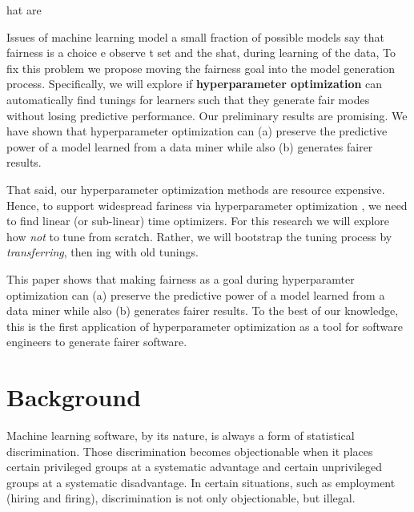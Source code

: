 hat are 

Issues of machine learning model 
a small fraction of   possible models say that {\e fairness is a choice}
e observe t set and the shat, during learning of the data,  To fix this problem we propose moving the fairness goal into the model generation process. Specifically, we will explore if 
  {\bf  hyperparameter optimization} can automatically find tunings for learners such that they generate fair modes without losing predictive performance. Our preliminary results are promising. We have shown that  hyperparameter optimization can (a) preserve the predictive power of a model learned from a data miner while also (b) generates fairer results. 
  
  That said, our
  hyperparameter optimization methods are resource expensive. Hence, to support    widespread fariness via hyperparameter optimization , we need to find linear (or sub-linear) time optimizers. 
  For this research we will explore how   {\em not} to tune from scratch.
  Rather, we will bootstrap the  tuning
  process by  {\em transferring}, then {\IT}ing with  old tunings.
  
This paper shows that making fairness as a goal during hyperparamter optimization can (a) preserve the predictive power of a model learned from a data miner while also (b) generates fairer results. To the best of our knowledge, this is the first application of hyperparameter optimization as a tool for software engineers to generate fairer software.


 \section{Background}\label{tion:back}

Machine learning software, by its nature, is always a form of statistical discrimination. 
Those discrimination becomes objectionable when it places certain privileged groups at  a systematic advantage and certain unprivileged groups at a systematic disadvantage. In certain situations, such as employment (hiring and firing), discrimination is not only objectionable, but illegal.

